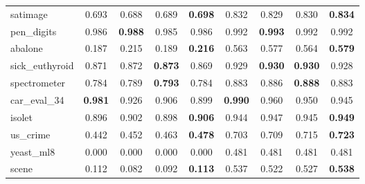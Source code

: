 \begin{figure}[ht]
\begin{tabular}{p{22mm}|*4{p{14mm}}|*4{p{14mm}}}
        satimage&\multicolumn{1}{c}{0.693}&\multicolumn{1}{c}{0.688}&\multicolumn{1}{c}{0.689}&\multicolumn{1}{c|}{\textbf{0.698}}&\multicolumn{1}{c}{0.832}&\multicolumn{1}{c}{0.829}&\multicolumn{1}{c}{0.830}&\multicolumn{1}{c}{\textbf{0.834}}\\
        pen\_digits&\multicolumn{1}{c}{0.986}&\multicolumn{1}{c}{\textbf{0.988}}&\multicolumn{1}{c}{0.985}&\multicolumn{1}{c|}{0.986}&\multicolumn{1}{c}{0.992}&\multicolumn{1}{c}{\textbf{0.993}}&\multicolumn{1}{c}{0.992}&\multicolumn{1}{c}{0.992}\\
        abalone&\multicolumn{1}{c}{0.187}&\multicolumn{1}{c}{0.215}&\multicolumn{1}{c}{0.189}&\multicolumn{1}{c|}{\textbf{0.216}}&\multicolumn{1}{c}{0.563}&\multicolumn{1}{c}{0.577}&\multicolumn{1}{c}{0.564}&\multicolumn{1}{c}{\textbf{0.579}}\\
        sick\_euthyroid&\multicolumn{1}{c}{0.871}&\multicolumn{1}{c}{0.872}&\multicolumn{1}{c}{\textbf{0.873}}&\multicolumn{1}{c|}{0.869}&\multicolumn{1}{c}{0.929}&\multicolumn{1}{c}{\textbf{0.930}}&\multicolumn{1}{c}{\textbf{0.930}}&\multicolumn{1}{c}{0.928}\\
        spectrometer&\multicolumn{1}{c}{0.784}&\multicolumn{1}{c}{0.789}&\multicolumn{1}{c}{\textbf{0.793}}&\multicolumn{1}{c|}{0.784}&\multicolumn{1}{c}{0.883}&\multicolumn{1}{c}{0.886}&\multicolumn{1}{c}{\textbf{0.888}}&\multicolumn{1}{c}{0.883}\\
        car\_eval\_34&\multicolumn{1}{c}{\textbf{0.981}}&\multicolumn{1}{c}{0.926}&\multicolumn{1}{c}{0.906}&\multicolumn{1}{c|}{0.899}&\multicolumn{1}{c}{\textbf{0.990}}&\multicolumn{1}{c}{0.960}&\multicolumn{1}{c}{0.950}&\multicolumn{1}{c}{0.945}\\
        isolet&\multicolumn{1}{c}{0.896}&\multicolumn{1}{c}{0.902}&\multicolumn{1}{c}{0.898}&\multicolumn{1}{c|}{\textbf{0.906}}&\multicolumn{1}{c}{0.944}&\multicolumn{1}{c}{0.947}&\multicolumn{1}{c}{0.945}&\multicolumn{1}{c}{\textbf{0.949}}\\
        us\_crime&\multicolumn{1}{c}{0.442}&\multicolumn{1}{c}{0.452}&\multicolumn{1}{c}{0.463}&\multicolumn{1}{c|}{\textbf{0.478}}&\multicolumn{1}{c}{0.703}&\multicolumn{1}{c}{0.709}&\multicolumn{1}{c}{0.715}&\multicolumn{1}{c}{\textbf{0.723}}\\
        yeast\_ml8&\multicolumn{1}{c}{0.000}&\multicolumn{1}{c}{0.000}&\multicolumn{1}{c}{0.000}&\multicolumn{1}{c|}{0.000}&\multicolumn{1}{c}{0.481}&\multicolumn{1}{c}{0.481}&\multicolumn{1}{c}{0.481}&\multicolumn{1}{c}{0.481}\\
        scene&\multicolumn{1}{c}{0.112}&\multicolumn{1}{c}{0.082}&\multicolumn{1}{c}{0.092}&\multicolumn{1}{c|}{\textbf{0.113}}&\multicolumn{1}{c}{0.537}&\multicolumn{1}{c}{0.522}&\multicolumn{1}{c}{0.527}&\multicolumn{1}{c}{\textbf{0.538}}\\

\end{tabular}
\end{figure}
